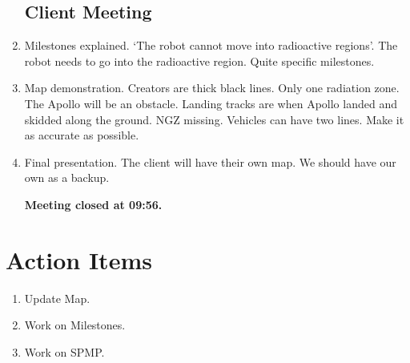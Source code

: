 \documentclass{article}
\begin{document}
\begin{enumerate}
\subsection{Client Meeting}
\item Milestones explained. `The robot cannot move into radioactive regions'. The robot needs to go into the radioactive region. Quite specific milestones.
\item Map demonstration. Creators are thick black lines. Only one radiation zone. The Apollo will be an obstacle. Landing tracks are when Apollo landed and skidded along the ground. NGZ missing. Vehicles can have two lines. Make it as accurate as possible. 
\item Final presentation. The client will have their own map. We should have our own as a backup. 


\vspace{.5cm}
\textbf{Meeting closed at 09:56.}\\
\end{enumerate}

\section{Action Items}
\begin{enumerate}
\item Update Map.
\item Work on Milestones.
\item Work on SPMP.
\end{enumerate}
\end{document}
